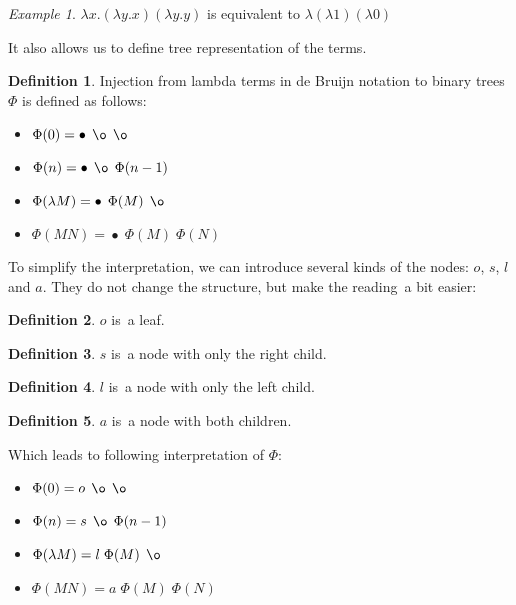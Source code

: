 \documentclass[final]{article}
\theoremstyle{definition}
\newtheorem{definition}{Definition}[subsection]
\theoremstyle{definition}
\theoremstyle{remark}
\newtheorem{example}{Example}[subsection]
\DeclareMathOperator{\n}{\bullet}
\DeclareMathOperator{\no}{\o}
\begin{document}
\begin{example}
    \(\lambda x . (\lambda y . x) (\lambda y . y)\) is equivalent to \(\lambda (\lambda 1) (\lambda 0)\)
\end{example}

It also allows us to define tree representation of the terms.

\begin{definition}
    Injection from lambda terms in de Bruijn notation to binary trees \(\Phi\) is defined as follows:
    \begin{itemize}
        \item \(\Phi(0) = \n\; \no\; \no\)
        \item \(\Phi(n) = \n\; \no\; \Phi(n - 1)\)
        \item \(\Phi(\lambda M) = \n\; \Phi(M)\; \no\)
        \item \(\Phi(M N) = \n\; \Phi(M)\; \Phi(N)\)
    \end{itemize}
\end{definition}

To simplify the interpretation, we can introduce several kinds of the nodes: \(o\), \(s\), \(l\) and \(a\). They do not change the structure, but make the reading~a bit easier:

\begin{definition}
    \(o\) is~a leaf.
\end{definition}

\begin{definition}
    \(s\) is~a node with only the right child.
\end{definition}

\begin{definition}
    \(l\) is~a node with only the left child.
\end{definition}

\begin{definition}
    \(a\) is~a node with both children.
\end{definition}

Which leads to following interpretation of \(\Phi\):

\begin{itemize}
    \item \(\Phi(0) = o\; \no\; \no\)
    \item \(\Phi(n) = s\; \no\; \Phi(n - 1)\)
    \item \(\Phi(\lambda M) = l\; \Phi(M)\; \no\)
    \item \(\Phi(M N) = a\; \Phi(M)\; \Phi(N)\)
\end{itemize}
\end{document}
